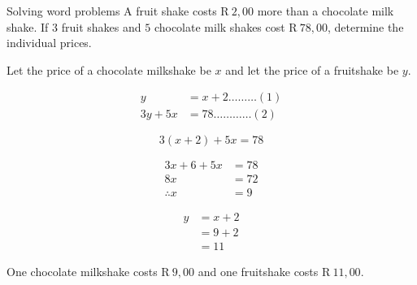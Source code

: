 \begin{wex}
{Solving word problems}
{A fruit shake costs R$~2,00$ more than a chocolate milk shake. If $3$
  fruit shakes and $5$ chocolate milk shakes cost R$~78,00$, determine
  the individual prices.}{
Let the price of a chocolate milkshake be $x$ and let the price of a fruitshake be $y$.

\begin{align*}
  y &= x+2  \ldots \ldots \ldots (1)\\
  3y+5x &= 78 \ldots \ldots \ldots \ldots (2)
\end{align*}

\begin{equation*}
  3(x+2)+5x = 78
\end{equation*}

\begin{align*}
  3x+6+5x &= 78 \\
  8x &= 72 \\
  \therefore x &= 9
\end{align*}

\begin{align*}
  y &= x+2 \\
  &= 9+2 \\
  &= 11
\end{align*}


One chocolate milkshake costs R$~9,00$ and one fruitshake costs R$~11,00$.
}
\end{wex}

